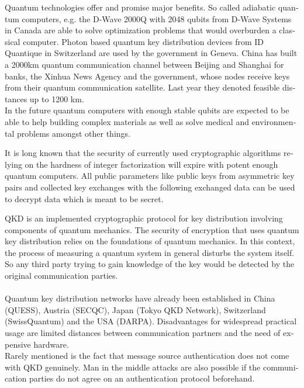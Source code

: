 \documentclass[a4paper,11pt,draft]{article}
\begin{document}
\begin{otherlanguage}{english}
\begin{multicols}{2}
Quantum technologies offer and promise major benefits. So called adiabatic quantum computers, e.g. the D-Wave 2000Q with 2048 qubits from D-Wave Systems in Canada are able to solve optimization problems that would overburden a classical computer. Photon based quantum key distribution devices from ID Quantique in Switzerland are used by the government in Geneva. China has built a 2000km quantum communication channel between Beijing and Shanghai for banks, the Xinhua News Agency and the government, whose nodes receive keys from their quantum communication satellite. Last year they denoted feasible distances up to 1200 km. \\
In the future quantum computers with enough stable qubits are expected to be able to help building complex materials as well as solve medical and environmental problems amongst other things.

It is long known that the security of currently used cryptographic algorithms relying on the hardness of integer factorization will expire with potent enough quantum computers. All public parameters like public keys from asymmetric key pairs and collected key exchanges with the following exchanged data can be used to decrypt data which is meant to be secret. \\


QKD is an implemented cryptographic protocol for key distribution involving components of quantum mechanics. The security of encryption that uses quantum key distribution relies on the foundations of quantum mechanics. In this context, the process of measuring a quantum system in general disturbs the system itself. So any third party trying to gain knowledge of the key would be detected by the original communication parties. \\ 
\\
Quantum key distribution networks have already been established in China (QUESS), Austria (SECQC), Japan (Tokyo QKD Network), Switzerland (SwissQuantum) and the USA (DARPA). 
Disadvantages for widespread practical usage are limited distances between communication partners and the need of expensive hardware. \\
Rarely mentioned is the fact that message source authentication does not come with QKD genuinely. Man in the middle attacks are also possible if the communication parties do not agree on an authentication protocol beforehand.  


\end{multicols}
\end{otherlanguage}
\end{document}
